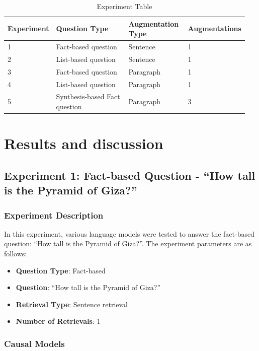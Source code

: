 \documentclass{wseas}
\begin{document}
\begin{table}[htbp]
\centering
\begin{tabular}{|p{0.15\linewidth}|p{0.35\linewidth}|p{0.25\linewidth}|p{0.20\linewidth}|}
\hline
\textbf{Experiment} & \textbf{Question Type} & \textbf{Augmentation Type} & \textbf{Augmentations} \\ \hline
1 & Fact-based question & Sentence & 1 \\ \hline
2 & List-based question & Sentence & 1 \\ \hline
3 & Fact-based question & Paragraph & 1 \\ \hline
4 & List-based question & Paragraph & 1 \\ \hline
5 & Synthesis-based Fact question & Paragraph & 3 \\ \hline
\end{tabular}
\caption{Experiment Table}
\end{table}

    

\section{Results and discussion}

\subsection{Experiment 1: Fact-based Question - ``How tall is the
Pyramid of
Giza?''}

\subsubsection{Experiment Description}
In this experiment, various language models were tested to answer the
fact-based question: ``How tall is the Pyramid of Giza?''. The
experiment parameters are as follows:

\begin{itemize}

\item
  \textbf{Question Type}: Fact-based
\item
  \textbf{Question}: ``How tall is the Pyramid of Giza?''
\item
  \textbf{Retrieval Type}: Sentence retrieval
\item
  \textbf{Number of Retrievals}: 1
\end{itemize}

\subsubsection{Causal Models}
\end{document}
